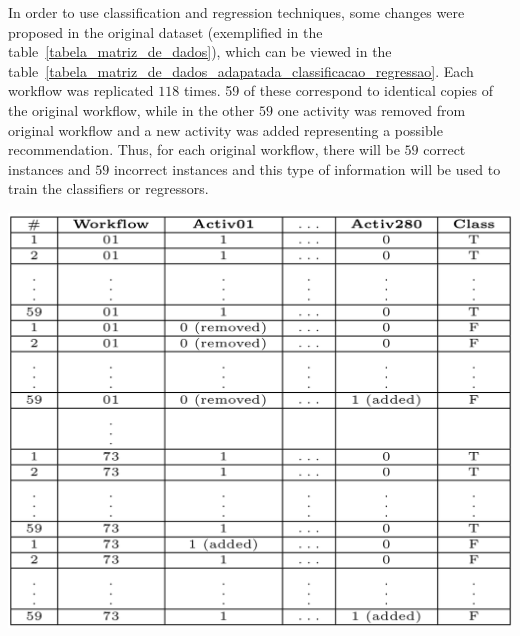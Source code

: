 \documentclass[40pt, a0, portrait]{a0poster}
\begin{document}
\begin{multicols}{2}
In order to use classification and regression techniques, some changes were proposed in the original dataset (exemplified in the table~\ref{tabela_matriz_de_dados}), which can be viewed in the table~\ref{tabela_matriz_de_dados_adapatada_classificacao_regressao}. Each workflow was replicated \(118\) times. 59 of these correspond to identical copies of the original workflow, while in the other \(59\) one activity was removed from original workflow and a new activity was added representing a possible recommendation. Thus, for each original workflow, there will be \(59\) correct instances and \(59\) incorrect instances and this type of information will be used to train the classifiers or regressors.


\begin{center}\vspace{1cm}
\includegraphics[width=0.8\linewidth]{matrizAdaptada.png}
\end{center}\vspace{1cm}


\end{multicols}
\end{document}
